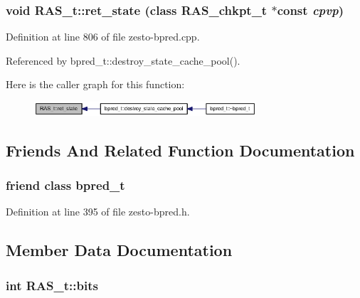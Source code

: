 \subsubsection[{ret\_\-state}]{\setlength{\rightskip}{0pt plus 5cm}void RAS\_\-t::ret\_\-state (class {\bf RAS\_\-chkpt\_\-t} $\ast$const  {\em cpvp})\hspace{0.3cm}{\tt  [virtual]}}\label{classRAS__t_e76acc444f340ba7c5170992c5e3ec3c}




Definition at line 806 of file zesto-bpred.cpp.

Referenced by bpred\_\-t::destroy\_\-state\_\-cache\_\-pool().

Here is the caller graph for this function:\nopagebreak
\begin{figure}[H]
\begin{center}
\leavevmode
\includegraphics[width=234pt]{classRAS__t_e76acc444f340ba7c5170992c5e3ec3c_icgraph}
\end{center}
\end{figure}


\subsection{Friends And Related Function Documentation}
\subsubsection[{bpred\_\-t}]{\setlength{\rightskip}{0pt plus 5cm}friend class {\bf bpred\_\-t}\hspace{0.3cm}{\tt  [friend]}}\label{classRAS__t_44319d3cf67079457eb46e2c6fcfeb49}




Definition at line 395 of file zesto-bpred.h.

\subsection{Member Data Documentation}
\subsubsection[{bits}]{\setlength{\rightskip}{0pt plus 5cm}int {\bf RAS\_\-t::bits}\hspace{0.3cm}{\tt  [protected]}}\label{classRAS__t_a00f75f412eedf4730ed2d922f348b1a}





